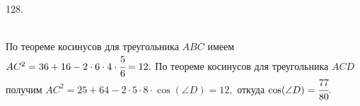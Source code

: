 128. \begin{figure}[ht!]
\end{figure}\\
По теореме косинусов для треугольника $ABC$ имеем $AC^2=36+16-2\cdot6\cdot4\cdot\cfrac{5}{6}=12.$ По теореме косинусов для треугольника $ACD$ получим $AC^2=25+64-2\cdot5\cdot8\cdot \cos(\angle D)=12,$ откуда $\cos(\angle D)=\cfrac{77}{80}.$\newpage\noindent
